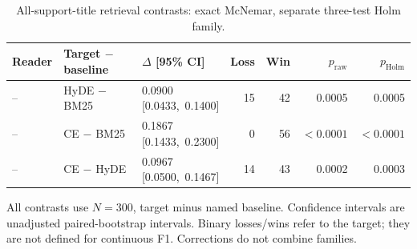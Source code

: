 \begin{table}[htbp]
\centering\footnotesize
\setlength{\tabcolsep}{3pt}
\renewcommand{\arraystretch}{1.08}
\caption{All-support-title retrieval contrasts: exact McNemar, separate three-test Holm family.}
\label{tab:followup_holdout_retrieval}
\begin{tabularx}{\textwidth}{l l >{\centering\arraybackslash}X r r r r}
\toprule
Reader & Target $-$ baseline & $\Delta$ [95\% CI] & Loss & Win & $p_{\mathrm{raw}}$ & $p_{\mathrm{Holm}}$ \\
\midrule
-- & HyDE $-$ BM25 & \shortstack{0.0900\\\mbox{[0.0433, 0.1400]}} & 15 & 42 & 0.0005 & 0.0005 \\
-- & CE $-$ BM25 & \shortstack{0.1867\\\mbox{[0.1433, 0.2300]}} & 0 & 56 & $<0.0001$ & $<0.0001$ \\
-- & CE $-$ HyDE & \shortstack{0.0967\\\mbox{[0.0500, 0.1467]}} & 14 & 43 & 0.0002 & 0.0003 \\
\bottomrule
\end{tabularx}
\begin{tablenotes}\footnotesize
\item All contrasts use $N=300$, target minus named baseline. Confidence intervals are unadjusted paired-bootstrap intervals. Binary losses/wins refer to the target; they are not defined for continuous F1. Corrections do not combine families.
\end{tablenotes}
\end{table}

